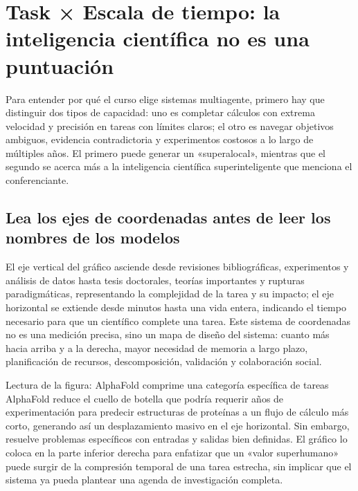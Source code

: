 \section{Task × Escala de tiempo: la inteligencia científica no es una puntuación}

Para entender por qué el curso elige sistemas multiagente, primero hay que distinguir dos tipos de capacidad: uno es completar cálculos con extrema velocidad y precisión en tareas con límites claros; el otro es navegar objetivos ambiguos, evidencia contradictoria y experimentos costosos a lo largo de múltiples años. El primero puede generar un «superalocal», mientras que el segundo se acerca más a la inteligencia científica superinteligente que menciona el conferenciante.

\subsection{Lea los ejes de coordenadas antes de leer los nombres de los modelos}

El eje vertical del gráfico asciende desde revisiones bibliográficas, experimentos y análisis de datos hasta tesis doctorales, teorías importantes y rupturas paradigmáticas, representando la complejidad de la tarea y su impacto; el eje horizontal se extiende desde minutos hasta una vida entera, indicando el tiempo necesario para que un científico complete una tarea. Este sistema de coordenadas no es una medición precisa, sino un mapa de diseño del sistema: cuanto más hacia arriba y a la derecha, mayor necesidad de memoria a largo plazo, planificación de recursos, descomposición, validación y colaboración social.


\begin{knowledgebox}{Lectura de la figura: AlphaFold comprime una categoría específica de tareas}
AlphaFold reduce el cuello de botella que podría requerir años de experimentación para predecir estructuras de proteínas a un flujo de cálculo más corto, generando así un desplazamiento masivo en el eje horizontal. Sin embargo, resuelve problemas específicos con entradas y salidas bien definidas. El gráfico lo coloca en la parte inferior derecha para enfatizar que un «valor superhumano» puede surgir de la compresión temporal de una tarea estrecha, sin implicar que el sistema ya pueda plantear una agenda de investigación completa.
\end{knowledgebox}

